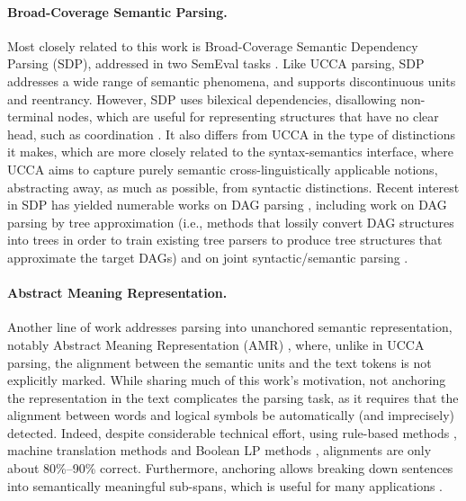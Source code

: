 \documentclass[11pt,a4paper]{article}
\newcommand{\secref}[1]{Section~\ref{#1}}
\begin{document}
\paragraph{Broad-Coverage Semantic Parsing.}
Most closely related to this work is Broad-Coverage Semantic Dependency Parsing (SDP),
addressed in two SemEval tasks \cite{oepen2014semeval,oepen2015semeval}.
Like UCCA parsing, SDP addresses a wide range of semantic phenomena,
and supports discontinuous units and reentrancy.
However, SDP uses bilexical dependencies, disallowing non-terminal nodes, which
are useful for representing structures that have no clear head, such as coordination
\cite[see \secref{sec:introduction}]{Ivanova2012who}. It also differs from UCCA in the type
of distinctions it makes, which are more closely related to the syntax-semantics interface,
where UCCA aims to capture purely semantic cross-linguistically applicable notions, abstracting
away, as much as possible, from syntactic distinctions.
Recent interest in SDP has yielded numerable works on DAG parsing
\cite{ribeyre-villemontedelaclergerie-seddah:2014:SemEval,thomson-EtAl:2014:SemEval,almeida-martins:2015:SemEval,du-EtAl:2015:SemEval}, including work on DAG parsing
by tree approximation (i.e., methods that lossily convert DAG structures
into trees in order to train existing tree parsers to produce tree structures
that approximate the target DAGs) \cite{agic-koller:2014:SemEval,schluter-EtAl:2014:SemEval}
and on joint syntactic/semantic parsing
\cite{henderson2013multilingual,swayamdipta-EtAl:2016:CoNLL}.

\paragraph{Abstract Meaning Representation.}
Another line of work addresses parsing into unanchored
semantic representation, notably Abstract Meaning Representation (AMR)
\cite{flanigan2014discriminative,vanderwende2015amr,pust2015parsing,artzi2015broad},
where, unlike in UCCA parsing, the alignment between the semantic units and the text tokens
is not explicitly marked.
While sharing much of this work's motivation, not anchoring the representation in the text
complicates the parsing task, as it requires
that the alignment between words and logical symbols be automatically
(and imprecisely) detected. Indeed, despite considerable technical effort,
using rule-based methods \cite{flanigan2014discriminative}, machine
translation methods \cite{pourdamghani2014aligning} and Boolean LP methods
\cite{werling2015robust}, alignments are only about 80\%--90\% correct.
Furthermore, anchoring allows breaking down sentences into semantically meaningful sub-spans,
which is useful for many applications \cite{fernandez2015parsing,birch2016hume}.
\end{document}
